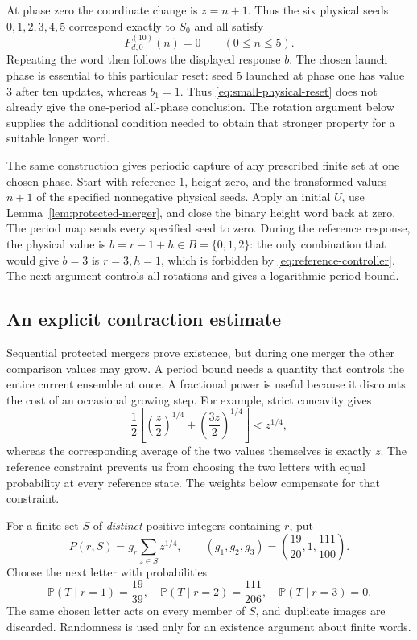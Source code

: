 At phase zero the coordinate change is $z=n+1$. Thus the six
physical seeds $0,1,2,3,4,5$ correspond exactly to $S_0$ and all
satisfy
\begin{equation}\label{eq:small-physical-reset}
 F_{d,0}^{(10)}(n)=0\qquad(0\le n\le5).
\end{equation}
Repeating the word then follows the displayed response $b$.
The chosen launch phase is essential to this particular reset:
seed $5$ launched at phase one has value $3$ after ten updates,
whereas $b_1=1$. Thus \eqref{eq:small-physical-reset} does not
already give the one-period all-phase conclusion. The rotation
argument below supplies the additional condition needed to obtain
that stronger property for a suitable longer word.

The same construction gives periodic capture of any prescribed finite
set at one chosen phase. Start with
reference $1$, height zero, and the transformed values $n+1$ of the
specified nonnegative physical seeds. Apply an initial $U$, use
Lemma~\ref{lem:protected-merger}, and close the binary height word
back at zero. The period map sends every specified seed to zero.
During the reference response, the physical value is
$b=r-1+h\in B=\{0,1,2\}$: the only combination that would give
$b=3$ is $r=3,h=1$, which is forbidden by
\eqref{eq:reference-controller}. The next argument controls all
rotations and gives a logarithmic period bound.

\subsection{An explicit contraction estimate}

Sequential protected mergers prove existence, but during one merger
the other comparison values may grow. A period bound needs a quantity
that controls the entire current ensemble at once. A fractional power
is useful because it discounts the cost of an occasional growing step.
For example, strict concavity gives
\[
 \frac12\left[\left(\frac z2\right)^{1/4}
              +\left(\frac{3z}{2}\right)^{1/4}\right]
 <z^{1/4},
\]
whereas the corresponding average of the two values themselves is
exactly $z$. The reference constraint prevents us from choosing the
two letters with equal probability at every reference state. The
weights below compensate for that constraint.

For a finite set $S$ of \emph{distinct} positive integers containing
$r$, put
\begin{equation}\label{eq:sync-potential}
 P(r,S)=g_r\sum_{z\in S}z^{1/4},\qquad
 (g_1,g_2,g_3)=\left(\frac{19}{20},1,\frac{111}{100}\right).
\end{equation}
Choose the next letter with probabilities
\begin{equation}\label{eq:reference-probabilities}
 \mathbb P(T\mid r=1)=\frac{19}{39},\quad
 \mathbb P(T\mid r=2)=\frac{111}{206},\quad
 \mathbb P(T\mid r=3)=0.
\end{equation}
The same chosen letter acts on every member of $S$, and duplicate
images are discarded. Randomness is used only for an existence
argument about finite words.

